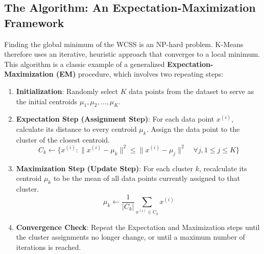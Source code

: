 \subsection*{The Algorithm: An Expectation-Maximization Framework}
Finding the global minimum of the WCSS is an NP-hard problem. K-Means therefore uses an iterative, heuristic approach that converges to a local minimum. This algorithm is a classic example of a generalized \textbf{Expectation-Maximization (EM)} procedure, which involves two repeating steps:

\begin{enumerate}
    \item \textbf{Initialization}: Randomly select $K$ data points from the dataset to serve as the initial centroids $\mu_1, \mu_2, \dots, \mu_K$.
    
    \item \textbf{Expectation Step (Assignment Step)}: For each data point $x^{(i)}$, calculate its distance to every centroid $\mu_k$. Assign the data point to the cluster of the closest centroid.
    $$ C_k \leftarrow \{ x^{(i)} : \|x^{(i)} - \mu_k\|^2 \le \|x^{(i)} - \mu_j\|^2 \quad \forall j, 1 \le j \le K \} $$
    
    \item \textbf{Maximization Step (Update Step)}: For each cluster $k$, recalculate its centroid $\mu_k$ to be the mean of all data points currently assigned to that cluster.
    $$ \mu_k \leftarrow \frac{1}{|C_k|} \sum_{x^{(i)} \in C_k} x^{(i)} $$
    
    \item \textbf{Convergence Check}: Repeat the Expectation and Maximization steps until the cluster assignments no longer change, or until a maximum number of iterations is reached.
\end{enumerate}

